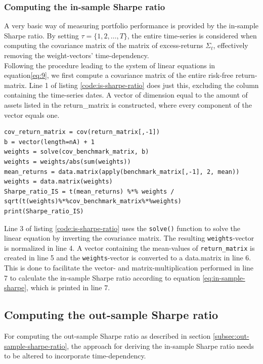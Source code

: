 \subsubsection{Computing the in-sample Sharpe ratio}
A very basic way of measuring portfolio performance is provided by the in-sample Sharpe ratio. By setting $\tau = \lbrace 1, 2, \dots, T \rbrace$, the entire time-series is considered when computing the covariance matrix of the matrix of excess-returns $\Sigma_t$, effectively removing the weight-vectors' time-dependency. \\

Following the procedure leading to the system of linear equations in equation\ref{eq:9}, we first compute a covariance matrix of the entire risk-free return-matrix. Line 1 of listing \ref{code:is-sharpe-ratio} does just this, excluding the column containing the time-series dates. A vector of dimension equal to the amount of assets listed in the return\_matrix is constructed, where every component of the vector equals one.\\

\begin{lstlisting}[caption={This example shows how the in-sample Sharpe ratio for a matrix of expected returns, computed in the R programming language.}, label=code:is-sharpe-ratio, frame=single]
cov_return_matrix = cov(return_matrix[,-1])
b = vector(length=nA) + 1
weights = solve(cov_benchmark_matrix, b)
weights = weights/abs(sum(weights))
mean_returns = data.matrix(apply(benchmark_matrix[,-1], 2, mean))
weights = data.matrix(weights)
Sharpe_ratio_IS = t(mean_returns) %*% weights / sqrt(t(weights)%*%cov_benchmark_matrix%*%weights)
print(Sharpe_ratio_IS)
\end{lstlisting}

Line 3 of listing \ref{code:is-sharpe-ratio} uses the \lstinline|solve()| function to solve the linear equation by inverting the covariance matrix. The resulting \lstinline|weights|-vector is normalized in line 4. A vector containing the mean-values of \lstinline|return_matrix| is created in line 5 and the \lstinline|weights|-vector is converted to a data.matrix in line 6. This is done to facilitate the vector- and matrix-multiplication performed in line 7 to calculate the in-sample Sharpe ratio according to equation \ref{eq:in-sample-sharpe}, which is printed in line 7.\\

\subsection{Computing the out-sample Sharpe ratio} \label{subsec:minVar-out-sample-sharpe}
For computing the out-sample Sharpe ratio as described in section \ref{subsec:out-sample-sharpe-ratio}, the approach for deriving the in-sample Sharpe ratio needs to be altered to incorporate time-dependency. \\

